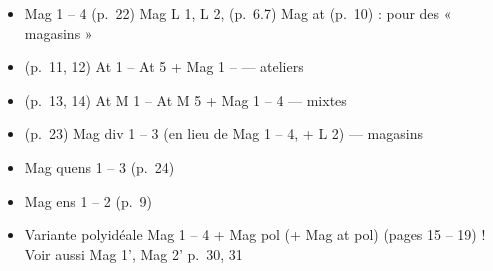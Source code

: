\documentclass[11pt,a4paper]{article}
\begin{document}
\begin{itemize}
  \item[] Mag 1 -- 4 (p.~22) Mag L 1, L 2, (p.~6.7) Mag at (p.~10) :
    pour des « \struck{\ill{}} magasins »
  \item[]  (p.~11, 12) At 1 -- At 5 + Mag 1 -- 
     --- ateliers
  \item[] (p.~13, 14) At M 1 -- At M 5 + Mag 1 -- 4 --- mixtes
  \item[] (p.~23) Mag div 1 -- 3 (en lieu de Mag 1 -- 4, + L 2) --- magasins
  \item[] Mag quens 1 -- 3 (p.~24)
  \item[] Mag ens 1 -- 2 (p.~9)
  \item[] Variante polyidéale Mag 1 -- 4 + Mag pol (+ Mag at pol) (pages 15 -- 19) !
    Voir aussi Mag 1', Mag 2' p.~30, 31
\end{itemize}
\end{document}
